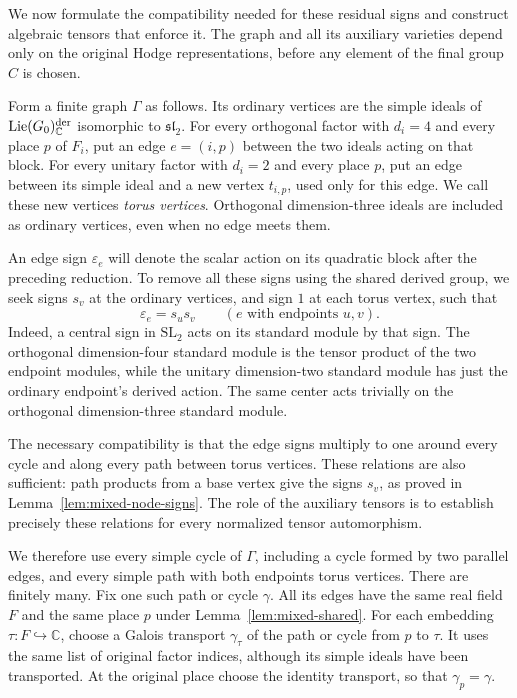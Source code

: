 \documentclass[11pt]{article}
\numberwithin{equation}{section}
\theoremstyle{definition}
\theoremstyle{remark}
\begin{document}
We now formulate the compatibility needed for these residual signs and
construct algebraic tensors that enforce it.  The graph and all its
auxiliary varieties depend only on the original Hodge representations,
before any element of the final group $C$ is chosen.

Form a finite graph $\Gamma$ as follows.  Its ordinary vertices are
the simple ideals of $\operatorname{Lie}(G_0)^{\rm der}_{\mathbb C}$
isomorphic to $\mathfrak{sl}_2$.  For every orthogonal factor with
$d_i=4$ and every place $p$ of $F_i$, put an edge $e=(i,p)$ between
the two ideals acting on that block.  For every unitary factor with
$d_i=2$ and every place $p$, put an edge between its simple ideal and
a new vertex $t_{i,p}$, used only for this edge.  We call these new
vertices \emph{torus vertices}.  Orthogonal dimension-three ideals
are included as ordinary vertices, even when no edge meets them.

An edge sign $\varepsilon_e$ will denote the scalar action on its
quadratic block after the preceding reduction.  To remove all these
signs using the shared derived group, we seek signs $s_v$ at the ordinary
vertices, and sign $1$ at each torus vertex, such that
\begin{equation}\label{eq:mixed-sign-target}
 \varepsilon_e=s_us_v
 \qquad(e\text{ with endpoints }u,v).
\end{equation}
Indeed, a central sign in $\mathrm{SL}_2$ acts on its standard module
by that sign.  The orthogonal dimension-four standard module is the
tensor product of the two endpoint modules, while the unitary
dimension-two standard module has just the ordinary endpoint's derived
action.  The same center acts trivially on the orthogonal
dimension-three standard module.

The necessary compatibility is that the edge signs multiply to one
around every cycle and along every path between torus vertices.
These relations are also sufficient: path products from a base vertex
give the signs $s_v$, as proved in Lemma~\ref{lem:mixed-node-signs}.
The role of the auxiliary tensors is to establish precisely these
relations for every normalized tensor automorphism.

We therefore use every simple cycle of $\Gamma$,
including a cycle formed by two parallel edges, and every simple path
with both endpoints torus vertices.  There are finitely many.  Fix one
such path or cycle $\gamma$.  All its edges have the same real field $F$ and
the same place $p$ under Lemma~\ref{lem:mixed-shared}.  For each
embedding $\tau:F\hookrightarrow\mathbb C$, choose a Galois transport
$\gamma_\tau$ of the path or cycle from $p$ to $\tau$.  It uses the
same list of original factor indices, although its simple ideals have
been transported.  At the original place choose the identity transport,
so that $\gamma_p=\gamma$.
\end{document}
